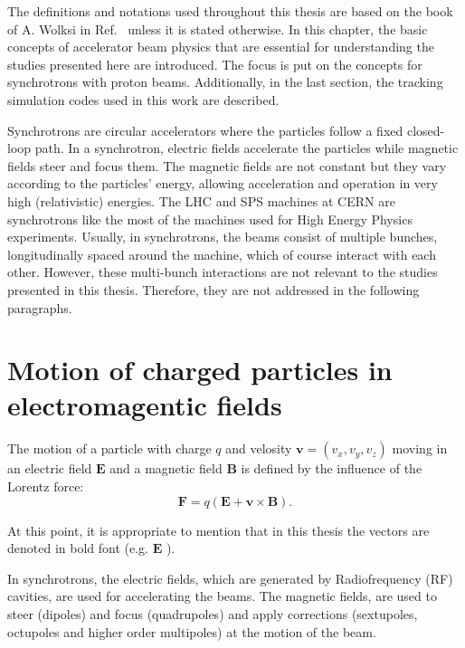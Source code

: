 The definitions and notations used throughout this thesis are based on the book of A. Wolksi in Ref.~\cite{wolski2014} unless it is stated otherwise. In this chapter, the basic concepts of accelerator beam physics that are essential for understanding the studies presented here are introduced. The focus is put on the concepts for synchrotrons with proton beams. Additionally, in the last section, the tracking simulation codes used in this work are described.

Synchrotrons are circular accelerators where the particles follow a fixed closed-loop path. In a synchrotron, electric fields accelerate the particles while magnetic fields steer and focus them. The magnetic fields are not constant but they vary according to the particles' energy, allowing acceleration and operation in very high (relativistic) energies. The LHC and SPS machines at CERN are synchrotrons like the most of the machines used for High Energy Physics experiments. Usually, in synchrotrons, the beams consist of multiple bunches, longitudinally spaced around the machine, which of course interact with each other. However, these multi-bunch interactions are not relevant to the studies presented in this thesis. Therefore, they are not addressed in the following paragraphs. 

\section{Motion of charged particles in electromagentic fields}
The motion of a particle with charge $q$ and velosity $\mathbf{v}=(v_x, v_y, v_z)$ moving in an electric field $\mathbf{E}$ and a magnetic field $\mathbf{B}$ is defined by the influence of the Lorentz force: 
\begin{equation}\label{eq:Lorentz_force}
    \mathbf{F} = q(\mathbf{E} + \mathbf{v} \times \mathbf{B}).
\end{equation}

At this point, it is appropriate to mention that in this thesis the vectors are denoted in bold font (e.g. $\mathbf{E}$ ). %

In synchrotrons, the electric fields, which are generated by Radiofrequency (RF) cavities, are used for accelerating the beams. The magnetic fields, are used to steer (dipoles) and focus (quadrupoles) and apply corrections (sextupoles, octupoles and higher order multipoles) at the motion of the beam.

